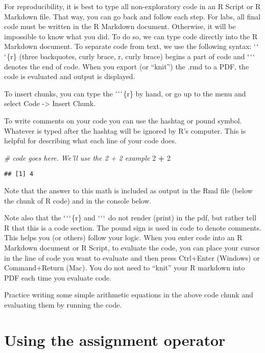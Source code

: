 \documentclass[]{article}
\newenvironment{Shaded}{\begin{snugshade}}{\end{snugshade}}
\newcommand{\CommentTok}[1]{\textcolor[rgb]{0.56,0.35,0.01}{\textit{#1}}}
\newcommand{\DecValTok}[1]{\textcolor[rgb]{0.00,0.00,0.81}{#1}}
\newcommand{\OperatorTok}[1]{\textcolor[rgb]{0.81,0.36,0.00}{\textbf{#1}}}
\newcommand{\StringTok}[1]{\textcolor[rgb]{0.31,0.60,0.02}{#1}}
\begin{document}
For reproducibility, it is best to type all non-exploratory code in an R
Script or R Markdown file. That way, you can go back and follow each
step. For labs, all final code must be written in the R Markdown
document. Otherwise, it will be impossible to know what you did. To do
so, we can type code directly into the R Markdown document. To separate
code from text, we use the following syntax: \(`\)\(`\)\(`\)\{r\} (three
backquotes, curly brace, r, curly brace) begins a part of code and
\(`\)\(`\)\(`\) denotes the end of code. When you export (or ``knit'')
the .rmd to a PDF, the code is evaluated and output is displayed.

To insert chunks, you can type the \(`\)\(`\)\(`\)\{r\} by hand, or go
up to the menu and select Code -\textgreater{} Insert Chunk.

To write comments on your code you can use the hashtag or pound symbol.
Whatever is typed after the hashtag will be ignored by R's computer.
This is helpful for describing what each line of your code does.

\begin{Shaded}
\begin{Highlighting}[]
\CommentTok{# code goes here. We'll use the 2 + 2 example}
\DecValTok{2} \OperatorTok{+}\StringTok{ }\DecValTok{2}
\end{Highlighting}
\end{Shaded}

\begin{verbatim}
## [1] 4
\end{verbatim}

Note that the answer to this math is included as output in the Rmd file
(below the chunk of R code) and in the console below.

Note also that the \(`\)\(`\)\(`\)\{r\} and \(`\)\(`\)\(`\) do not
render (print) in the pdf, but rather tell R that this is a code
section. The pound sign is used in code to denote comments. This helps
you (or others) follow your logic. When you enter code into an R
Markdown document or R Script, to evaluate the code, you can place your
cursor in the line of code you want to evaluate and then press
Ctrl+Enter (Windows) or Command+Return (Mac). You do not need to
``knit'' your R markdown into PDF each time you evaluate code.

Practice writing some simple arithmetic equations in the above code
chunk and evaluating them by running the code.

\hypertarget{using-the-assignment-operator}{%
\section{Using the assignment
operator}\label{using-the-assignment-operator}}
\end{document}
